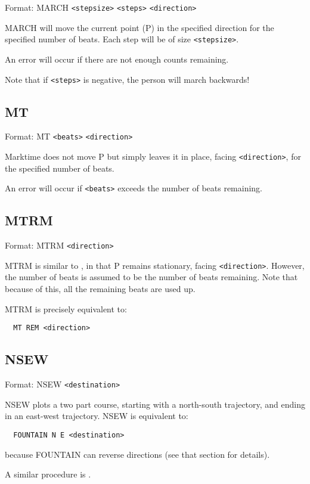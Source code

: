 Format: MARCH \verb$<stepsize>$ \verb$<steps>$ \verb$<direction>$

MARCH will move the current point (P) in the specified direction for the
specified number of beats.  Each step will be of size \verb$<stepsize>$.

An error will occur if there are not enough counts remaining.

Note that if \verb$<steps>$ is negative, the person will march backwards!

\subsection{MT}\label{mt}

Format: MT \verb$<beats>$ \verb$<direction>$

Marktime does not move P but simply leaves it in place, facing
\verb$<direction>$, for the specified number of beats.

An error will occur if \verb$<beats>$ exceeds the number of beats remaining.

\subsection{MTRM}\label{mtrm}

Format: MTRM \verb$<direction>$

MTRM is similar to , in that P remains stationary,
facing \verb$<direction>$.  However, the number of beats is assumed to
be the number of beats remaining.  Note that because of this, all the
remaining beats are used up.

MTRM is precisely equivalent to:
\begin{verbatim}
  MT REM <direction>
\end{verbatim}

\subsection{NSEW}\label{nsew}

Format: NSEW \verb$<destination>$

NSEW plots a two part course, starting with a north-south trajectory, and
ending in an east-west trajectory.  NSEW is equivalent to:
\begin{verbatim}
  FOUNTAIN N E <destination>
\end{verbatim}
because FOUNTAIN can reverse directions (see that section for details).

A similar procedure is .

